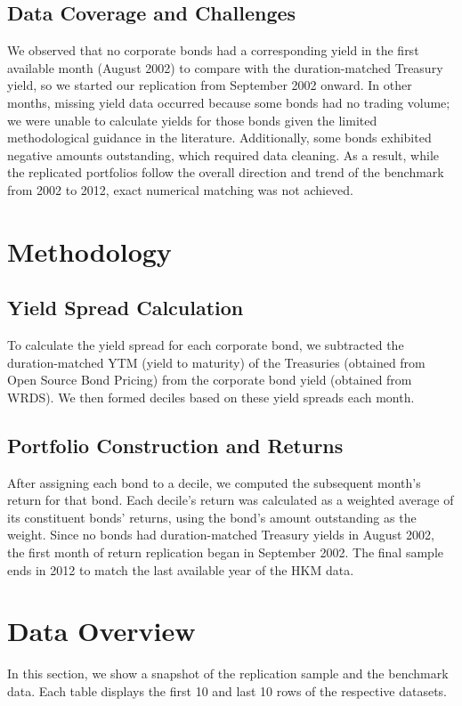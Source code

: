 \documentclass[12pt]{article}
\begin{document}
\subsection{Data Coverage and Challenges}
We observed that no corporate bonds had a corresponding yield in the first available month (August 2002) to compare with the duration-matched Treasury yield, so we started our replication from September 2002 onward. In other months, missing yield data occurred because some bonds had no trading volume; we were unable to calculate yields for those bonds given the limited methodological guidance in the literature. Additionally, some bonds exhibited negative amounts outstanding, which required data cleaning. As a result, while the replicated portfolios follow the overall direction and trend of the benchmark from 2002 to 2012, exact numerical matching was not achieved.

\section{Methodology}
\subsection{Yield Spread Calculation}
To calculate the yield spread for each corporate bond, we subtracted the duration-matched YTM (yield to maturity) of the Treasuries (obtained from Open Source Bond Pricing) from the corporate bond yield (obtained from WRDS). We then formed deciles based on these yield spreads each month.

\subsection{Portfolio Construction and Returns}
After assigning each bond to a decile, we computed the subsequent month’s return for that bond. Each decile’s return was calculated as a weighted average of its constituent bonds’ returns, using the bond’s amount outstanding as the weight. Since no bonds had duration-matched Treasury yields in August 2002, the first month of return replication began in September 2002. The final sample ends in 2012 to match the last available year of the HKM data.

\section{Data Overview}
In this section, we show a snapshot of the replication sample and the benchmark data. Each table displays the first 10 and last 10 rows of the respective datasets.
\end{document}
